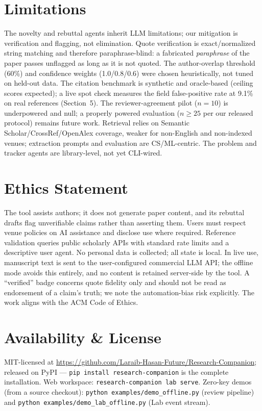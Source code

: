 \documentclass[11pt]{article}
\begin{document}
\section*{Limitations}
The novelty and rebuttal agents inherit LLM limitations; our mitigation is verification and flagging, not elimination. Quote verification is exact/normalized string matching and therefore paraphrase-blind: a fabricated \emph{paraphrase} of the paper passes unflagged as long as it is not quoted. The author-overlap threshold (60\%) and confidence weights (1.0/0.8/0.6) were chosen heuristically, not tuned on held-out data. The citation benchmark is synthetic and oracle-based (ceiling scores expected); a live spot check measures the field false-positive rate at 9.1\% on real references (Section~5). The reviewer-agreement pilot ($n=10$) is underpowered and null; a properly powered evaluation ($n \geq 25$ per our released protocol) remains future work. Retrieval relies on Semantic Scholar/CrossRef/OpenAlex coverage, weaker for non-English and non-indexed venues; extraction prompts and evaluation are CS/ML-centric. The problem and tracker agents are library-level, not yet CLI-wired.

\section*{Ethics Statement}
The tool assists authors; it does not generate paper content, and its rebuttal drafts flag unverifiable claims rather than asserting them. Users must respect venue policies on AI assistance and disclose use where required. Reference validation queries public scholarly APIs with standard rate limits and a descriptive user agent. No personal data is collected; all state is local. In live use, manuscript text is sent to the user-configured commercial LLM API; the offline mode avoids this entirely, and no content is retained server-side by the tool. A ``verified'' badge concerns quote fidelity only and should not be read as endorsement of a claim's truth; we note the automation-bias risk explicitly. The work aligns with the ACM Code of Ethics.

\section*{Availability \& License}
MIT-licensed at \url{https://github.com/Laraib-Hasan-Future/Research-Companion}; released on PyPI --- \texttt{pip install research-companion} is the complete installation. Web workspace: \texttt{research-companion lab serve}. Zero-key demos (from a source checkout): \texttt{python examples/demo\_offline.py} (review pipeline) and \texttt{python examples/demo\_lab\_offline.py} (Lab event stream).
\end{document}
